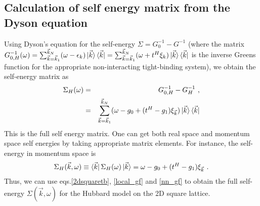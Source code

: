 \documentclass[12pt]{article}
\numberwithin{equation}{section}
\begin{document}
\subsection{Calculation of self energy matrix from the Dyson equation}
Using Dyson's equation for the self-energy $\Sigma = G_{0}^{-1} - G^{-1}$ (where the matrix $G_{0,H}^{-1} (\omega) = \sum_{\vec k=\vec k_1}^{\vec k_N} (\omega -\epsilon_{k})\ket{\vec k}\bra{\vec k}=\sum_{\vec k=\vec k_1}^{\vec k_N} (\omega +t^{H}\xi_{k})\ket{\vec k}\bra{\vec k} $ is the inverse Greens function for the appropriate non-interacting tight-binding system), we obtain the self-energy matrix as
\begin{eqnarray}
\Sigma_{H} (\omega) &=& G_{0,H}^{-1} - G_{H}^{-1}~,\nonumber\\
&=&\sum_{\vec k=\vec k_1}^{\vec k_N} (\omega - g_{0} + (t^{H} - g_{1})\xi_{\vec{k}})\ket{\vec k}\bra{\vec k}
\end{eqnarray}
This is the full self energy matrix. One can get both real space and momentum space self energies by taking appropriate matrix elements. For instance, the self-energy in momentum space is
\begin{equation}\begin{aligned}
	\label{selfenergy}
	\Sigma_{H} (\vec{k},\omega) \equiv \bra{\vec k} \Sigma_H (\omega) \ket{\vec k} = \omega - g_{0} + (t^{H} - g_{1})\xi_{\vec{k}}~.
\end{aligned}\end{equation}
Thus, we can use eqs.\eqref{2dsquaretb}, \eqref{local_gf} and \eqref{nn_gf} to obtain the full self-energy $\Sigma (\vec{k},\omega)$ for the Hubbard model on the 2D square lattice.
\end{document}

